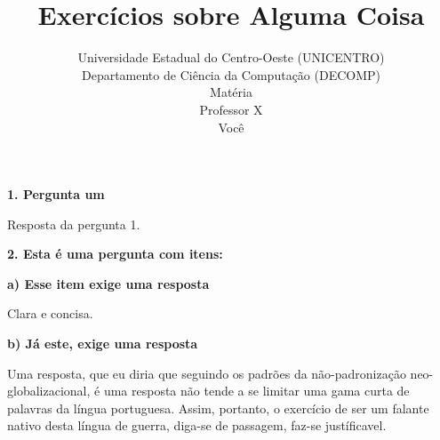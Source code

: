 \documentclass[12pt,a4paper]{article}
\title{Exercícios sobre Alguma Coisa}
\author{Universidade Estadual do Centro-Oeste (UNICENTRO)\\
        Departamento de Ciência da Computação (DECOMP)\\
        Matéria \\
        Professor X \\
        Você }
\newcommand{\pergunta}[1]{\vspace{10pt} \par \noindent \textbf{#1} \par}
\newcommand{\pitem}[1]{\vspace{5pt} \par \noindent \textbf{#1} \par}
\begin{document}
\maketitle

\pergunta{1. Pergunta um}

Resposta da pergunta 1.

\pergunta{2. Esta é uma pergunta com itens:}

\pitem{a) Esse item exige uma resposta}
Clara e concisa.
\pitem{b) Já este, exige uma resposta}
Uma resposta, que eu diria que seguindo os padrões da não-padronização 
neo-globalizacional, é uma resposta não tende a se limitar uma gama curta
de palavras da língua portuguesa.  Assim, portanto, o exercício de ser um
falante nativo desta língua de guerra, diga-se de passagem, faz-se justíficavel.
\end{document}
